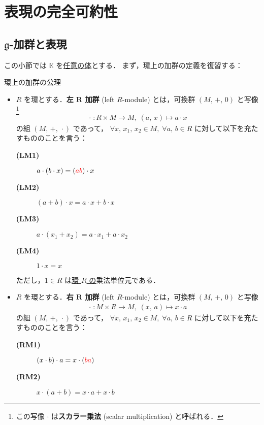 \documentclass[rep_main]{subfiles}
\begin{document}
\section{表現の完全可約性}

\subsection{$\mathfrak{g}$-加群と表現}

この小節では $\mathbb{K}$ を\underline{任意の体}とする．
まず，環上の加群の定義を復習する：

\begin{myaxiom}[label=ax:R-module,breakable]{環上の加群の公理}
	\begin{itemize}
		\item $R$ を環とする．\textbf{左 $\bm{R}$ 加群} (left $R$-module) とは，可換群 $(M,\, +,\, 0)$ と写像\footnote{この写像 $\cdot$ は\textbf{スカラー乗法} (scalar multiplication) と呼ばれる．}
		\begin{align}
			\cdot \; \colon R \times M \to M,\; (a,\, x) \mapsto a \cdot x
		\end{align}
		の組 $(M,\, +,\,\cdot\mathrel{})$ であって， $\forall x,\, x_1,\, x_2 \in M,\; \forall a,\, b \in R$ に対して以下を充たすもののことを言う：
		\begin{description}
			\item[\textbf{(LM1)}] $a \cdot (b \cdot x) = (\textcolor{red}{ab}) \cdot x$
			\item[\textbf{(LM2)}] $(a+b) \cdot x = a \cdot x + b \cdot x$
			\item[\textbf{(LM3)}] $a \cdot (x_1 + x_2) = a \cdot x_1 + a\cdot x_2$
			\item[\textbf{(LM4)}] $1 \cdot x = x$
		\end{description}
		ただし，$1 \in R$ は\underline{環 $R$ の}乗法単位元である．
		\item $R$ を環とする．\textbf{右 $\bm{R}$ 加群} (left $R$-module) とは，可換群 $(M,\, +,\, 0)$ と写像
		\begin{align}
			\cdot \; \colon M \times R \to M,\; (x,\, a) \mapsto x \cdot a
		\end{align}
		の組 $(M,\, +,\,\cdot\mathrel{})$ であって， $\forall x,\, x_1,\, x_2 \in M,\; \forall a,\, b \in R$ に対して以下を充たすもののことを言う：
		\begin{description}
			\item[\textbf{(RM1)}] $(x \cdot b) \cdot a = x \cdot (\textcolor{red}{ba})$
			\item[\textbf{(RM2)}] $x \cdot (a+b) = x \cdot a + x \cdot b$

\end{description}
\end{itemize}
\end{myaxiom}
\end{document}
